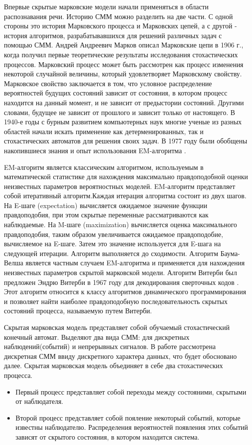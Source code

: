 Впервые скрытые марковские модели начали применяться в области распознавания речи. Историю СММ можно разделить на две части. \cite{kouemou} С одной стороны это история Марковского процесса и Марковских цепей, а с другой - история алгоритмов, разрабатывавшихся для решений различных задач с помощью СММ. Андрей Андреевич Марков описал Марковские цепи в 1906 г., когда получил первые теоретические результаты исследования стохастических процессов. Марковский процесс может быть рассмотрен как процесс изменения некоторой случайной величины, который удовлетворяет Марковскому свойству. Марковское свойство заключается в том, что условное распределение вероятностей будущих состояний зависит от состояния, в котором процесс находится на данный момент, и не зависит от предыстории состояний. Другими словами, будущее не зависит от прошлого и зависит только от настоящего. В 1940-е годы с бурным развитием компьютерных наук многие ученые из разных областей начали искать применение как детерменированных, так и стохастических автоматов для решения своих задач. В 1977 году были обобщены накопившиеся знания и опыт использования EM-алгоритма \cite{dempster1977maximum}. 

EM-алгоритм является классическим алгоритмом, используемым в математической статистике для нахождения максимально правдоподобной оценки неизвестных параметров вероятностных моделей. EM-алгоритм представляет собой итеративный алгоритм.Каждая итерация алгоритма состоит из двух шагов. На E-шаге (expectation) вычисляется ожидаемое значение функции правдоподобия, при этом скрытые переменные рассматриваются как наблюдаемые. На M-шаге (maximization) вычисляется оценка максимального правдоподобия, таким образом увеличивается ожидаемое правдоподобие, вычисляемое на E-шаге. Затем это значение используется для E-шага на следующей итерации. Алгоритм выполняется до сходимости. Алгоритм Баума-Велша является частным случаем EM-алгоритма и применяется для нахождения неизвестных параметров скрытой марковской модели. Алгоритм Витерби был предложен Эндрю Витерби в 1967 году для декодирования сверточных кодов \cite{viterbi1967error}. Этот алгоритм относится к классу алгоритмов динамического программирования и позволяет найти наиболее правдоподобную последовательность скрытых состояний процесса, называемую путем Витерби.

Скрытая марковская модель представляет собой обучаемый стохастический конечный автомат. Выделяют два вида СММ: для дискретных наблюдений(событий) и непрерывных сигналов. В работе рассмотрена дискретная СММ ввиду дискретного характера данных, что будет обосновано далее. Скрытая марковская модель объединяет в себе два стохастических процесса.
\begin{itemize}
\item
Первый процесс представляет собой переходы между состояними, скрытыми от наблюдателя.
\item
Второй процесс представляет собой пояление некоторый событий, которые известны наблюдателю. Распределения вероятностей появления этих событий зависят от скрытого состояния, в котором находится система.
\end{itemize}


